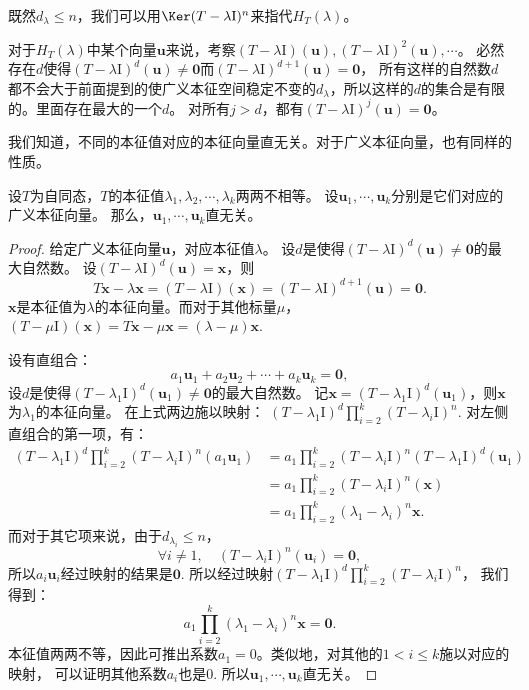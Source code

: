 \documentclass[12pt,UTF8]{ctexbook}
\begin{document}
既然$d_\lambda \leqslant n$，我们可以用$\Ker (T - \lambda\mathrm{I})^n$来指代$H_T(\lambda)$。

对于$H_T(\lambda)$中某个向量$\mathbf{u}$来说，考察$(T - \lambda\mathrm{I})(\mathbf{u}), (T - \lambda\mathrm{I})^2(\mathbf{u}), \cdots$。
必然存在$d$使得$(T - \lambda\mathrm{I})^{d}(\mathbf{u}) \neq \mathbf{0}$而$(T - \lambda\mathrm{I})^{d+1}(\mathbf{u}) = \mathbf{0}$，
所有这样的自然数$d$都不会大于前面提到的使广义本征空间稳定不变的$d_\lambda$，所以这样的$d$的集合是有限的。里面存在最大的一个$d$。
对所有$j>d$，都有$(T - \lambda\mathrm{I})^{j}(\mathbf{u}) = \mathbf{0}$。

我们知道，不同的本征值对应的本征向量直无关。对于广义本征向量，也有同样的性质。

\begin{pp}\label{pp:6_12_0}
设$T$为自同态，$T$的本征值$\lambda_1, \lambda_2, \cdots, \lambda_k$两两不相等。
设$\mathbf{u}_1, \cdots , \mathbf{u}_k$分别是它们对应的广义本征向量。
那么，$\mathbf{u}_1, \cdots , \mathbf{u}_k$直无关。
\end{pp}
\begin{proof} %
给定广义本征向量$\mathbf{u}$，对应本征值$\lambda$。
设$d$是使得$(T - \lambda\mathrm{I})^{d}(\mathbf{u}) \neq \mathbf{0}$的最大自然数。
设$(T - \lambda\mathrm{I})^{d}(\mathbf{u}) = \mathbf{x}$，则
$$T\mathbf{x} - \lambda \mathbf{x} = (T - \lambda\mathrm{I})(\mathbf{x}) = (T - \lambda\mathrm{I})^{d+1}(\mathbf{u}) = \mathbf{0}.$$
$\mathbf{x}$是本征值为$\lambda$的本征向量。而对于其他标量$\mu$，
$(T - \mu\mathrm{I})(\mathbf{x}) = T\mathbf{x} - \mu\mathbf{x} = (\lambda - \mu)\mathbf{x}.$

设有直组合：
$$ a_1\mathbf{u}_1 + a_2\mathbf{u}_2 + \cdots + a_k\mathbf{u}_k = \mathbf{0},$$
设$d$是使得$(T - \lambda_1\mathrm{I})^{d}(\mathbf{u}_1) \neq \mathbf{0}$的最大自然数。
记$\mathbf{x} = (T - \lambda_1\mathrm{I})^{d}(\mathbf{u}_1)$，则$\mathbf{x}$为$\lambda_1$的本征向量。
在上式两边施以映射：
$(T - \lambda_1\mathrm{I})^{d}\prod_{i=2}^k (T - \lambda_i\mathrm{I})^{n}$.  
对左侧直组合的第一项，有：
\begin{align*}
(T - \lambda_1\mathrm{I})^{d}\prod_{i=2}^k (T - \lambda_i\mathrm{I})^{n}(a_1\mathbf{u}_1) 
&= a_1\prod_{i=2}^k (T - \lambda_i\mathrm{I})^{n}(T - \lambda_1\mathrm{I})^{d}(\mathbf{u}_1)  \\
&= a_1\prod_{i=2}^k (T - \lambda_i\mathrm{I})^{n}(\mathbf{x})  \\
&= a_1\prod_{i=2}^k (\lambda_1 - \lambda_i)^{n}\mathbf{x}.
\end{align*}
而对于其它项来说，由于$d_{\lambda_i} \leqslant n$，
$$ \forall i \neq 1, \quad (T - \lambda_i\mathrm{I})^{n}(\mathbf{u}_i) = \mathbf{0},$$
所以$a_i\mathbf{u}_i$经过映射的结果是$\mathbf{0}$.
所以经过映射$(T - \lambda_1\mathrm{I})^{d}\prod_{i=2}^k (T - \lambda_i\mathrm{I})^{n}$，
我们得到：
$$a_1\prod_{i=2}^k (\lambda_1 - \lambda_i)^{n}\mathbf{x} = \mathbf{0}.$$
本征值两两不等，因此可推出系数$a_1 = 0$。类似地，对其他的$1 < i \leqslant k $施以对应的映射，
可以证明其他系数$a_i$也是$0$. 所以$\mathbf{u}_1, \cdots , \mathbf{u}_k$直无关。

\end{proof}
\end{document}
